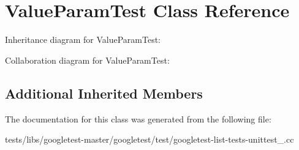 \hypertarget{classValueParamTest}{}\section{Value\+Param\+Test Class Reference}
\label{classValueParamTest}


Inheritance diagram for Value\+Param\+Test\+:


Collaboration diagram for Value\+Param\+Test\+:
\subsection*{Additional Inherited Members}


The documentation for this class was generated from the following file\+:\begin{DoxyCompactItemize}
\item 
tests/libs/googletest-\/master/googletest/test/googletest-\/list-\/tests-\/unittest\+\_\+.\+cc\end{DoxyCompactItemize}
